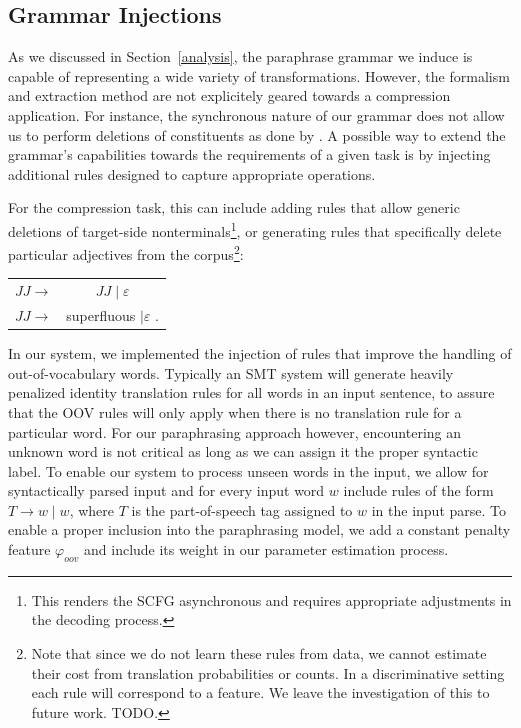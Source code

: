 \documentclass[11pt]{article}
\begin{document}
\subsection{Grammar Injections} \label{injection}

As we discussed in Section~\ref{analysis}, the paraphrase grammar we
induce is capable of representing a wide variety of
transformations. However, the formalism and extraction method are not
explicitely geared towards a compression application. For instance,
the synchronous nature of our grammar does not allow us to perform
deletions of constituents as done by .  A possible
way to extend the grammar's capabilities towards the requirements of a
given task is by injecting additional rules designed to capture
appropriate operations. 

For the compression task, this can include adding rules that allow
generic deletions of target-side nonterminals\footnote{This renders
  the SCFG asynchronous and requires appropriate adjustments in the
  decoding process.}, or generating rules that specifically delete
particular adjectives from the corpus\footnote{Note that since we do
  not learn these rules from data, we cannot estimate their cost from
  translation probabilities or counts. In a discriminative setting
  each rule will correspond to a feature. We leave the investigation
  of this to future work. TODO.}:
\begin{center}
\begin{tabular}{cc}
 $\mathit{JJ} \rightarrow$ & $\mathit{JJ} \mid \varepsilon$ \\
 $\mathit{JJ} \rightarrow$ & superfluous $\mid \varepsilon$ . \\
\end{tabular}
\end{center}
In our system, we implemented the injection of rules that improve the
handling of out-of-vocabulary words. Typically an SMT system will
generate heavily penalized identity translation rules for all words in
an input sentence, to assure that the OOV rules will only apply when
there is no translation rule for a particular word. For our
paraphrasing approach however, encountering an unknown word is not
critical as long as we can assign it the proper syntactic label. To
enable our system to process unseen words in the input, we allow for
syntactically parsed input and for every input word $w$ include rules
of the form $\mathit{T} \rightarrow w \mid w$, where $T$ is the
part-of-speech tag assigned to $w$ in the input parse. To enable a
proper inclusion into the paraphrasing model, we add a constant
penalty feature $\varphi_{\mathit{oov}}$ and include its weight in our
parameter estimation process.
\end{document}
